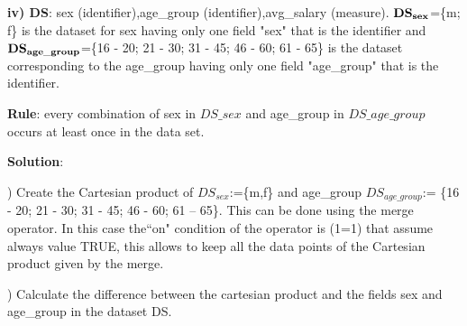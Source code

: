 \begin{table}
\begin{center}
\footnotesize
{}
\caption{Translation of example iii)}
\centering
\label{Tab1-4}
\end{center}
\end{table}


\bigskip\noindent
\textbf{iv) DS}:  sex (identifier),age\_group (identifier),avg\_salary (measure). $\bold{DS_{sex}}$=\{m; f\} is the dataset for sex having only one field "sex" that is the identifier and  
$\bold{DS_{age\_group}}$=\{16 - 20; 21 - 30; 31 - 45; 46 - 60; 61 - 65\}  is the dataset corresponding to the age\_group having only one field "age\_group" that is the identifier.


\bigskip\noindent
\textbf{Rule}: every combination of sex in $DS\_{sex}$ and age\_group in $DS\_{age\_group}$ occurs at least once in the data set. 

\bigskip\noindent
\textbf{Solution}:

) Create the Cartesian product of $DS_{sex}$:=\{m,f\} and age\_group  $ DS_{age\_group}$:= \{16 - 20; 21 - 30; 31 - 45; 46 - 60; 61 – 65\}. This can be done using the merge operator. In this case the``on" condition of the operator is (1=1) that assume always value TRUE, this allows to keep all the data points of the Cartesian product given by the merge.

) Calculate the difference between the cartesian product and the fields sex and age\_group in the dataset DS. 

